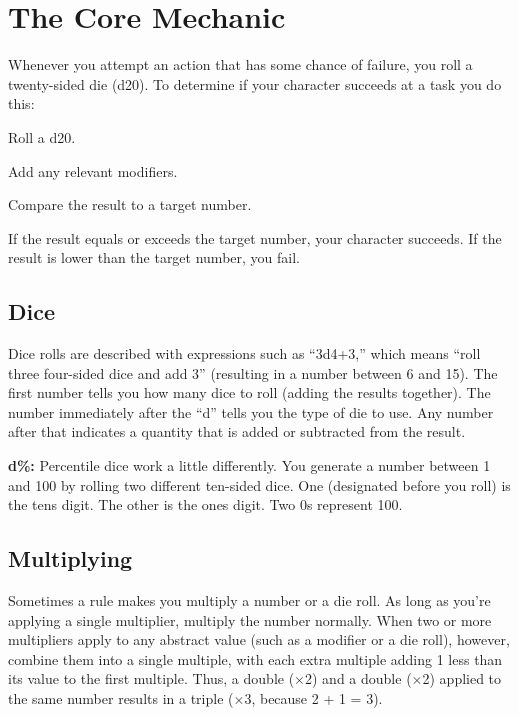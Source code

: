 \section{The Core Mechanic}
Whenever you attempt an action that has some chance of failure, you roll a twenty-sided die (d20). To determine if your character succeeds at a task you do this:

\begin{itemize*}
\item Roll a d20.
\item Add any relevant modifiers.
\item Compare the result to a target number.
\item If the result equals or exceeds the target number, your character succeeds. If the result is lower than the target number, you fail.
\end{itemize*}

\subsection{Dice}
Dice rolls are described with expressions such as ``3d4+3,'' which means ``roll three four-sided dice and add 3'' (resulting in a number between 6 and 15). The first number tells you how many dice to roll (adding the results together). The number immediately after the ``d'' tells you the type of die to use. Any number after that indicates a quantity that is added or subtracted from the result.

\textbf{d\%:} Percentile dice work a little differently. You generate a number between 1 and 100 by rolling two different ten-sided dice. One (designated before you roll) is the tens digit. The other is the ones digit. Two 0s represent 100.



\subsection{Multiplying}
Sometimes a rule makes you multiply a number or a die roll. As long as you're applying a single multiplier, multiply the number normally. When two or more multipliers apply to any abstract value (such as a modifier or a die roll), however, combine them into a single multiple, with each extra multiple adding 1 less than its value to the first multiple. Thus, a double ($\times$2) and a double ($\times$2) applied to the same number results in a triple ($\times$3, because 2 + 1 = 3).

